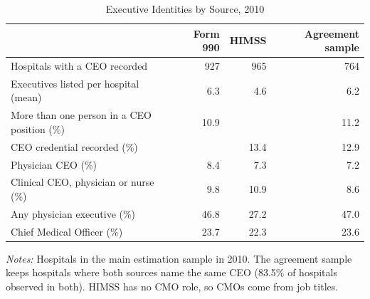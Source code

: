 \begin{table}

\caption{\label{tab:desc_sources}Executive Identities by Source, 2010}
\centering
\begin{threeparttable}
\begin{tabular}[t]{lrrr}
\toprule
 & Form 990 & HIMSS & Agreement sample\\
\midrule
Hospitals with a CEO recorded & 927 & 965 & 764\\
Executives listed per hospital (mean) & 6.3 & 4.6 & 6.2\\
More than one person in a CEO position (\%) & 10.9 &  & 11.2\\
CEO credential recorded (\%) &  & 13.4 & 12.9\\
Physician CEO (\%) & 8.4 & 7.3 & 7.2\\
Clinical CEO, physician or nurse (\%) & 9.8 & 10.9 & 8.6\\
Any physician executive (\%) & 46.8 & 27.2 & 47.0\\
Chief Medical Officer (\%) & 23.7 & 22.3 & 23.6\\
\bottomrule
\end{tabular}
\begin{tablenotes}[flushleft]
\footnotesize
\item \textit{Notes:} Hospitals in the main estimation sample in 2010. The agreement sample keeps hospitals where both sources name the same CEO (83.5\% of hospitals observed in both). HIMSS has no CMO role, so CMOs come from job titles.
\end{tablenotes}
\end{threeparttable}
\end{table}
